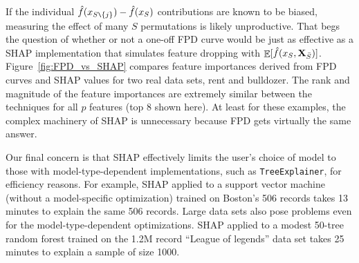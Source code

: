 \documentclass[11pt]{article}
\newcommand{\figref}[1]{Figure~\ref{#1}}
\DeclareMathOperator{\Ex}{\mathbb{E}}
\begin{document}
If the individual $\hat{f}(x_{S \texttt{\char`\\} \{j\}}) - \hat{f}(x_{S})$ contributions are known to be biased, measuring the effect of many $S$ permutations is likely unproductive. That begs the question of whether or not a one-off FPD curve would be just as effective as a SHAP implementation that  simulates feature dropping with $\Ex[\hat{f}(x_{S},{\bf X}_{\bar{S}})]$.  \figref{fig:FPD_vs_SHAP} compares feature importances derived from FPD curves and SHAP values for two real data sets, rent and bulldozer. The rank and magnitude of the feature importances are extremely similar between the techniques for all $p$ features (top 8 shown here). At least for these examples, the complex machinery of SHAP is unnecessary because FPD gets virtually the same answer.

Our final concern is that SHAP effectively limits the user's choice of model to those with model-type-dependent implementations, such as {\tt\small TreeExplainer}, for efficiency reasons. For example, SHAP applied to a support vector machine (without a model-specific optimization) trained on Boston's 506 records takes 13 minutes to explain the same 506 records.  Large data sets also pose problems even for the model-type-dependent optimizations. SHAP applied to a modest 50-tree random forest trained on the 1.2M record ``League of legends'' data set \citep{lol} takes 25 minutes to explain a sample of size 1000.
\end{document}
